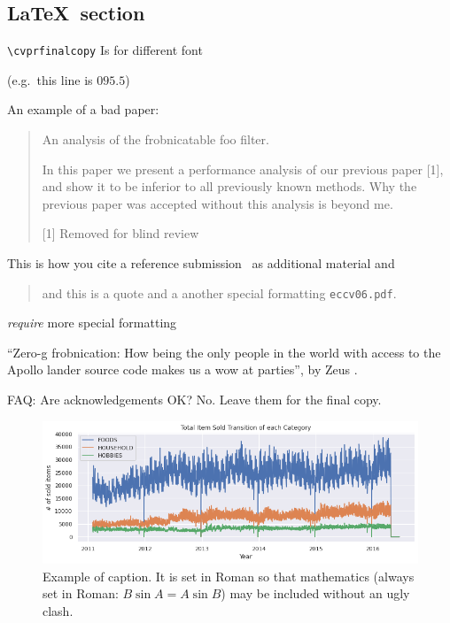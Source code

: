 \documentclass[10pt,twocolumn,letterpaper]{article}
\begin{document}
\subsection{\LaTeX\ section}
\verb'\cvprfinalcopy' Is for different font

(e.g.\ this line is $095.5$)

An example of a bad paper:
\begin{quote}
\begin{center}
    An analysis of the frobnicatable foo filter.
\end{center}

   In this paper we present a performance analysis of our
   previous paper [1], and show it to be inferior to all
   previously known methods.  Why the previous paper was
   accepted without this analysis is beyond me.

   [1] Removed for blind review
\end{quote}

This is how you cite a reference submission~\cite{Authors06} as additional material and

\begin{quote}
and this is a quote and a another special formatting {\tt eccv06.pdf}.
\end{quote}

{\em require} more special formatting

``Zero-g frobnication: How being the only people in the world with access to
the Apollo lander source code makes us a wow at parties'', by Zeus \etal.

FAQ: Are acknowledgements OK?  No.  Leave them for the final copy.


\begin{figure}[t]
  \begin{center}
    \fbox{\rule{0pt}{2in} \rule{0.9\linewidth}{0pt}}
    \includegraphics[width=0.8\linewidth]{img/meh.png}
  \end{center}
    \caption{Example of caption.  It is set in Roman so that mathematics
    (always set in Roman: $B \sin A = A \sin B$) may be included without an
    ugly clash.}
  \label{fig:long}
  \label{fig:onecol}
\end{figure}
\end{document}
